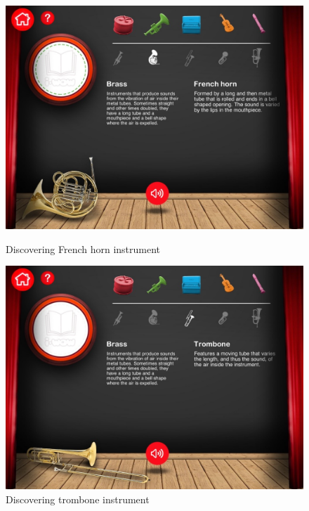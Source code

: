 \begin{figure}[ht!]
  \centering
  \includegraphics[width=350pt]{graphics/additional-screens/discovering_brass_french_horn_screen.jpg}
  \vspace{0.05cm}
  \caption{Discovering French horn instrument}
  \vspace{0.6cm}

  \includegraphics[width=350pt]{graphics/additional-screens/discovering_brass_trombone_screen.jpg}
  \vspace{0.05cm}
  \caption{Discovering trombone instrument}
\end{figure}

